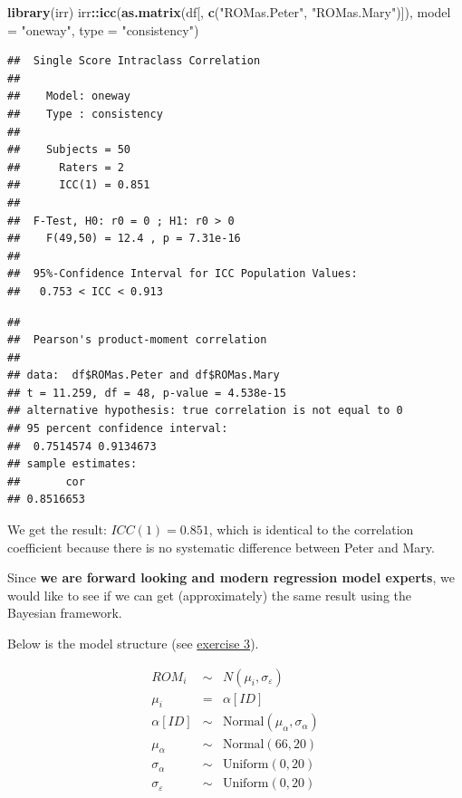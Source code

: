 \documentclass[
]{book}
\newenvironment{Shaded}{\begin{snugshade}}{\end{snugshade}}
\newcommand{\AttributeTok}[1]{\textcolor[rgb]{0.13,0.29,0.53}{#1}}
\newcommand{\FunctionTok}[1]{\textcolor[rgb]{0.13,0.29,0.53}{\textbf{#1}}}
\newcommand{\NormalTok}[1]{#1}
\newcommand{\SpecialCharTok}[1]{\textcolor[rgb]{0.81,0.36,0.00}{\textbf{#1}}}
\newcommand{\StringTok}[1]{\textcolor[rgb]{0.31,0.60,0.02}{#1}}
\begin{document}
\begin{Shaded}
\begin{Highlighting}[]
\FunctionTok{library}\NormalTok{(irr)}
\NormalTok{irr}\SpecialCharTok{::}\FunctionTok{icc}\NormalTok{(}\FunctionTok{as.matrix}\NormalTok{(df[, }\FunctionTok{c}\NormalTok{(}\StringTok{"ROMas.Peter"}\NormalTok{, }\StringTok{"ROMas.Mary"}\NormalTok{)]), }
    \AttributeTok{model =} \StringTok{"oneway"}\NormalTok{, }\AttributeTok{type =} \StringTok{"consistency"}\NormalTok{)}
\end{Highlighting}
\end{Shaded}

\begin{verbatim}
##  Single Score Intraclass Correlation
## 
##    Model: oneway 
##    Type : consistency 
## 
##    Subjects = 50 
##      Raters = 2 
##      ICC(1) = 0.851
## 
##  F-Test, H0: r0 = 0 ; H1: r0 > 0 
##    F(49,50) = 12.4 , p = 7.31e-16 
## 
##  95%-Confidence Interval for ICC Population Values:
##   0.753 < ICC < 0.913
\end{verbatim}

\begin{Shaded}
\end{Shaded}

\begin{verbatim}
## 
##  Pearson's product-moment correlation
## 
## data:  df$ROMas.Peter and df$ROMas.Mary
## t = 11.259, df = 48, p-value = 4.538e-15
## alternative hypothesis: true correlation is not equal to 0
## 95 percent confidence interval:
##  0.7514574 0.9134673
## sample estimates:
##       cor 
## 0.8516653
\end{verbatim}

We get the result: \(ICC(1) = 0.851\), which is identical to the correlation coefficient
because there is no systematic difference between Peter and Mary.

Since \textbf{we are forward looking and modern regression model experts},
we would like to see if we can get (approximately) the same result using the Bayesian
framework.

Below is the model structure (see \hyperref[exercise3]{exercise 3}).

\[
\begin{array}{rcl}
ROM_i &\sim& N(\mu_i, \sigma_{\varepsilon}) \\
\mu_i &=& \alpha[ID] \\
\alpha[ID] &\sim& \text{Normal}(\mu_{\alpha}, \sigma_{\alpha}) \\
\mu_{\alpha} &\sim& \text{Normal}(66, 20) \\
\sigma_{\alpha} &\sim& \text{Uniform}(0,20) \\
\sigma_{\varepsilon} &\sim& \text{Uniform}(0,20)
\end{array}
\]
\end{document}
